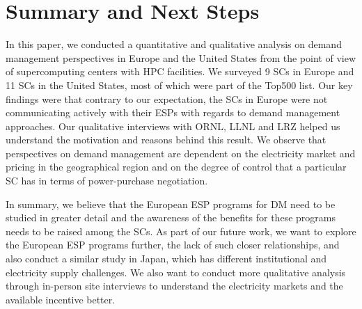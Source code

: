 \section{Summary and Next Steps}
\label{summary}

In this paper, we conducted a quantitative and qualitative analysis on demand management perspectives in Europe and the United States from the point of view of supercomputing centers with HPC facilities. We surveyed 9 SCs in Europe and 11 SCs in the United States, most of which were part of the Top500 list. Our key findings were that contrary to our expectation, the SCs in Europe were not communicating actively with their ESPs with regards to demand management approaches. Our qualitative interviews with ORNL, LLNL and LRZ helped us understand the motivation and reasons behind this result. We observe that perspectives on demand management are dependent on the electricity market and pricing in the geographical region and on the degree of control that a particular SC has in terms of power-purchase negotiation.

In summary, we believe that the European ESP programs for DM need to be studied in greater detail and the awareness of the benefits for these programs needs to be raised among the SCs. As part of our future work, we want to explore the European ESP programs further, the lack of such closer relationships, and also conduct a similar study in Japan, which has different institutional and electricity supply challenges. We also want to conduct more qualitative analysis through in-person site interviews to understand the electricity markets and the available incentive better. 
